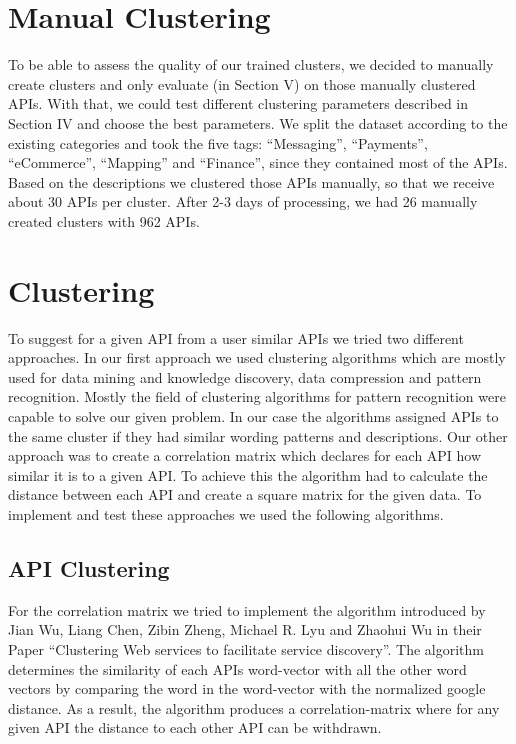 \documentclass[a4paper]{IEEEtran}
\begin{document}
\section{Manual Clustering}
To be able to assess the quality of our trained clusters, we decided to manually create clusters and only evaluate (in Section V) on those manually clustered APIs. With that, we could test different clustering parameters described in Section IV and choose the best parameters. We split the dataset according to the existing categories and took the five tags: “Messaging”, “Payments”, “eCommerce”, “Mapping” and “Finance”, since they contained most of the APIs. Based on the descriptions we clustered those APIs manually, so that we receive about 30 APIs per cluster. After 2-3 days of processing, we had 26 manually created clusters with 962 APIs.

\section{Clustering}
To suggest for a given API from a user similar APIs we tried two different approaches. In our first approach we used clustering algorithms which are mostly used for data mining and knowledge discovery, data compression and pattern recognition. Mostly the field of clustering algorithms for pattern recognition were capable to solve our given problem. In our case the algorithms assigned APIs to the same cluster if they had similar wording patterns and descriptions. 
Our other approach was to create a correlation matrix which declares for each API how similar it is to a given API. To achieve this the algorithm had to calculate the distance between each API and create a square matrix for the given data.
To implement and test these approaches we used the following algorithms.

\subsection{API Clustering}
For the correlation matrix we tried to implement the algorithm introduced by Jian Wu, Liang Chen, Zibin Zheng, Michael R. Lyu and Zhaohui Wu in their Paper “Clustering Web services to facilitate service discovery”. The algorithm determines the similarity of each APIs word-vector with all the other word vectors by comparing the word in the word-vector with the normalized google distance. As a result, the algorithm produces a correlation-matrix where for any given API the distance to each other API can be withdrawn.
\end{document}
